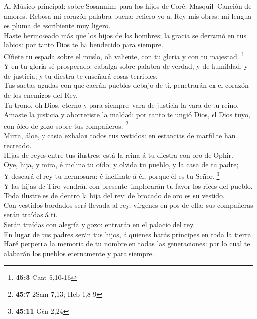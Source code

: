  Al Músico principal: sobre Sosannim: para los hijos de
Coré: Masquil: Canción de amores. Rebosa mi corazón palabra buena:
refiero yo al Rey mis obras: mi lengua es pluma de escribiente muy
ligero.\\
 Haste hermoseado más que los hijos de los hombres; la
gracia se derramó en tus labios: por tanto Dios te ha bendecido para
siempre.\\
 Cíñete tu espada sobre el muslo, oh valiente, con tu gloria
y con tu majestad. \footnote{\textbf{45:3} Cant 5,10-16}\\
 Y en tu gloria sé prosperado: cabalga sobre palabra de
verdad, y de humildad, y de justicia; y tu diestra te enseñará cosas
terribles.\\
 Tus saetas agudas con que caerán pueblos debajo de ti,
penetrarán en el corazón de los enemigos del Rey.\\
 Tu trono, oh Dios, eterno y para siempre: vara de justicia
la vara de tu reino.\\
 Amaste la justicia y aborreciste la maldad: por tanto te
ungió Dios, el Dios tuyo, con óleo de gozo sobre tus compañeros.
\footnote{\textbf{45:7} 2Sam 7,13; Heb 1,8-9}\\
 Mirra, áloe, y casia exhalan todos tus vestidos: en
estancias de marfil te han recreado.\\
 Hijas de reyes entre tus ilustres: está la reina á tu
diestra con oro de Ophir.\\
 Oye, hija, y mira, é inclina tu oído; y olvida tu pueblo,
y la casa de tu padre;\\
 Y deseará el rey tu hermosura: é inclínate á él, porque él
es tu Señor. \footnote{\textbf{45:11} Gén 2,24}\\
 Y las hijas de Tiro vendrán con presente; implorarán tu
favor los ricos del pueblo.\\
 Toda ilustre es de dentro la hija del rey: de brocado de
oro es su vestido.\\
 Con vestidos bordados será llevada al rey; vírgenes en pos
de ella: sus compañeras serán traídas á ti.\\
 Serán traídas con alegría y gozo: entrarán en el palacio
del rey.\\
 En lugar de tus padres serán tus hijos, á quienes harás
príncipes en toda la tierra.\\
 Haré perpetua la memoria de tu nombre en todas las
generaciones: por lo cual te alabarán los pueblos eternamente y para
siempre.

